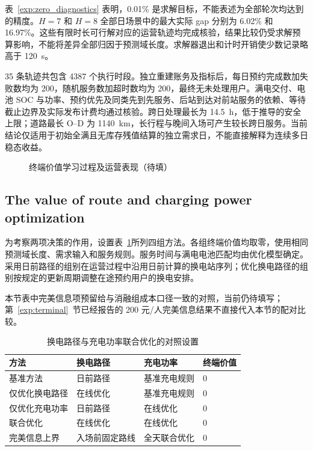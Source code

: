表~\ref{exp:zero_diagnostics} 表明，0.01\% 是求解目标，不能表述为全部轮次均达到的精度。$H=7$ 和 $H=8$ 全部日场景中的最大实际 gap 分别为 6.02\% 和 16.97\%。这些有限时长可行解对应的运营轨迹均完成核验，结果比较仍受求解预算影响，不能将差异全部归因于预测域长度。求解器退出和计时开销使少数记录略高于 120~s。

35 条轨迹共包含 4387 个执行时段。独立重建账务及指标后，每日预约完成数加失败数均为 200，随机服务数加超时数均为 200，最终无未处理用户。满电交付、电池 SOC 与功率、预约优先及同类先到先服务、后站到达对前站服务的依赖、等待截止边界及实际发布计费均通过核验。跨日处理最长为 14.5~h，低于推导的安全上限；道路最长 O--D 为 1140~km，长行程与晚间入场可产生较长跨日服务。当前结论仅适用于初始全满且无库存残值结算的独立需求日，不能直接解释为连续多日稳态收益。

\begin{figure}[!htbp]
  \centering
  \caption{终端价值学习过程及运营表现（待填）}
  \label{exp:value_figure}
\end{figure}



\FloatBarrier
\subsection{The value of route and charging power optimization}
\label{exp:joint}

为考察两项决策的作用，设置表~\ref{exp:joint_methods}所列四组方法。各组终端价值均取零，使用相同预测域长度、需求输入和服务规则。服务时间与满电电池匹配均由优化模型确定。采用日前路径的组别在运营过程中沿用日前计算的换电站序列；优化换电路径的组别按规定的更新周期调整在途预约用户的换电安排。

本节表中完美信息项预留给与消融组成本口径一致的对照，当前仍待填写；第~\ref{exp:terminal}~节已经报告的 200 元/人完美信息结果不直接代入本节的配对比较。

\begin{table}[!htbp]
  \centering
  \caption{换电路径与充电功率联合优化的对照设置}
  \label{exp:joint_methods}
  \small
  \begin{tabularx}{\linewidth}{@{}Xlll@{}}
    \toprule
    方法 & 换电路径 & 充电功率 & 终端价值 \\
    \midrule
    基准方法 & 日前路径 & 基准充电规则 & 0 \\
    仅优化换电路径 & 在线优化 & 基准充电规则 & 0 \\
    仅优化充电功率 & 日前路径 & 在线优化 & 0 \\
    联合优化 & 在线优化 & 在线优化 & 0 \\
    完美信息上界 & 入场前固定路线 & 全天联合优化 & 0 \\
    \bottomrule
  \end{tabularx}
\end{table}


